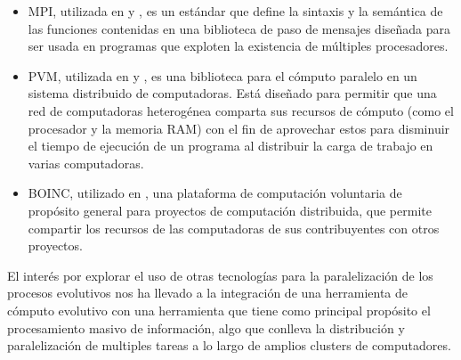 \begin{itemize}
	\item MPI, utilizada en \cite{DBLP:conf/pvm/1999} y \cite{DBLP:conf/pvm/FernandezTVB00}, es un estándar que define la sintaxis y la semántica de las funciones contenidas en una biblioteca de paso de mensajes diseñada para ser usada en programas que exploten la existencia de múltiples procesadores.
	\item PVM, utilizada en \cite{DBLP:conf/pvm/FernandezSTG99} y \cite{DBLP:conf/pvm/2000}, es una biblioteca para el cómputo paralelo en un sistema distribuido de computadoras. Está diseñado para permitir que una red de computadoras heterogénea comparta sus recursos de cómputo (como el procesador y la memoria RAM) con el fin de aprovechar estos para disminuir el tiempo de ejecución de un programa al distribuir la carga de trabajo en varias computadoras.
	\item BOINC, utilizado en \cite{feki2009parallel}, una plataforma de computación voluntaria de propósito general para proyectos de computación distribuida, que permite compartir los recursos de las computadoras de sus contribuyentes con otros proyectos. 
\end{itemize}

El inter\'es por explorar el uso de otras tecnologías para la paralelizaci\'on de los procesos evolutivos nos ha llevado a la integración de una herramienta de c\'omputo evolutivo con una herramienta que tiene como principal propósito el procesamiento masivo de información, algo que conlleva la distribución y paralelizaci\'on de multiples tareas a lo largo de amplios clusters de computadores.




















